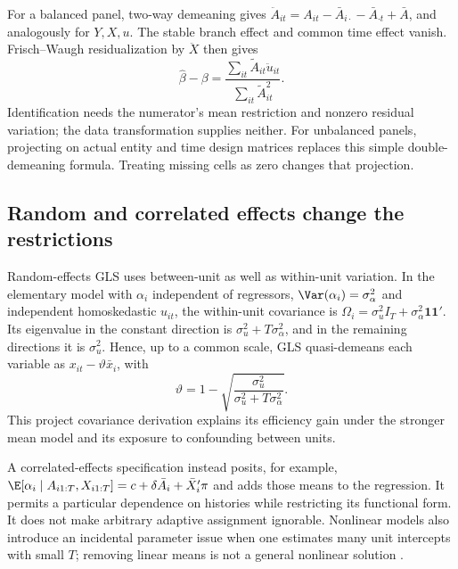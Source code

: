 For a balanced panel, two-way demeaning gives
$\ddot A_{it}=A_{it}-\bar A_{i\cdot}-\bar A_{\cdot t}+\bar A$,
and analogously for $Y,X,u$. The stable branch effect and common time
effect vanish. Frisch--Waugh residualization by $\ddot X$ then gives
\[
 \widehat\beta-\beta
 =\frac{\sum_{it}\widetilde A_{it}\ddot u_{it}}
        {\sum_{it}\widetilde A_{it}^2}.
\]
Identification needs the numerator's mean restriction and nonzero
residual variation; the data transformation supplies neither.
For unbalanced panels, projecting on actual entity and time design
matrices replaces this simple double-demeaning formula. Treating
missing cells as zero changes that projection.

\subsection{Random and correlated effects change the restrictions}
Random-effects GLS uses between-unit as well as within-unit variation.
In the elementary model with $\alpha_i$ independent of regressors,
$\Var(\alpha_i)=\sigma_\alpha^2$ and independent homoskedastic
$u_{it}$, the within-unit covariance is
$\Omega_i=\sigma_u^2I_T+\sigma_\alpha^2\mathbf1\mathbf1'$.
Its eigenvalue in the constant direction is
$\sigma_u^2+T\sigma_\alpha^2$, and in the remaining directions
it is $\sigma_u^2$. Hence, up to a common scale, GLS quasi-demeans
each variable as $x_{it}-\vartheta\bar x_i$, with
\[
 \vartheta=1-\sqrt{\frac{\sigma_u^2}{\sigma_u^2+T\sigma_\alpha^2}}.
\]
This project covariance derivation explains its efficiency gain under
the stronger mean model and its exposure to confounding between units.

A correlated-effects specification instead posits, for example,
$\E[\alpha_i\mid A_{i1:T},X_{i1:T}]
=c+\delta\bar A_i+\bar X_i'\pi$ and adds those means to the
regression. It permits a particular dependence on histories while
restricting its functional form. It does not make arbitrary adaptive
assignment ignorable. Nonlinear models also introduce an incidental
parameter issue when one estimates many unit intercepts with small
$T$; removing linear means is not a general nonlinear solution
\citep[Sections 2 and 3]{panelreview2024}.

